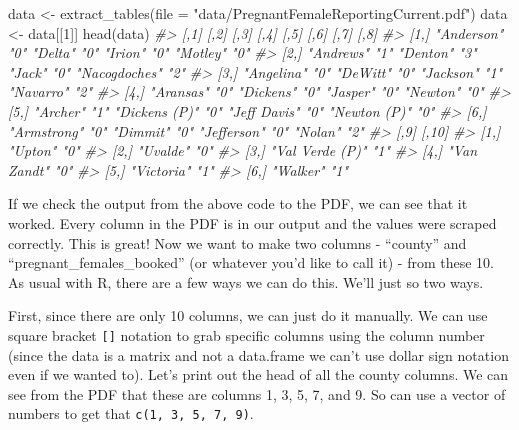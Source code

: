 \documentclass[
]{krantz}
\makeatletter
\newenvironment{Shaded}{\begin{snugshade}}{\end{snugshade}}
\newcommand{\AttributeTok}[1]{\textcolor[rgb]{0.61,0.61,0.61}{#1}}
\newcommand{\CommentTok}[1]{\textcolor[rgb]{0.37,0.37,0.37}{\textit{#1}}}
\newcommand{\DecValTok}[1]{\textcolor[rgb]{0.06,0.06,0.06}{#1}}
\newcommand{\FunctionTok}[1]{\textcolor[rgb]{0,0,0}{#1}}
\newcommand{\NormalTok}[1]{#1}
\newcommand{\OtherTok}[1]{\textcolor[rgb]{0.37,0.37,0.37}{#1}}
\newcommand{\StringTok}[1]{\textcolor[rgb]{0.5,0.5,0.5}{#1}}
\newenvironment{kframe}{%
\medskip{}
\setlength{\fboxsep}{.8em}
 \def\at@end@of@kframe{}%
 \ifinner\ifhmode%
  \def\at@end@of@kframe{\end{minipage}}%
  \begin{minipage}{\columnwidth}%
 \fi\fi%
 \def\FrameCommand##1{\hskip\@totalleftmargin \hskip-\fboxsep
 \colorbox{shadecolor}{##1}\hskip-\fboxsep
     \hskip-\linewidth \hskip-\@totalleftmargin \hskip\columnwidth}%
 \MakeFramed {\advance\hsize-\width
   \@totalleftmargin\z@ \linewidth\hsize
   \@setminipage}}%
 {\par\unskip\endMakeFramed%
 \at@end@of@kframe}
\renewenvironment{Shaded}{\begin{kframe}}{\end{kframe}}
\makeatother
\begin{document}
\begin{Shaded}
\begin{Highlighting}[]
\NormalTok{data }\OtherTok{\textless{}{-}} \FunctionTok{extract\_tables}\NormalTok{(}\AttributeTok{file =} \StringTok{"data/PregnantFemaleReportingCurrent.pdf"}\NormalTok{)}
\NormalTok{data }\OtherTok{\textless{}{-}}\NormalTok{ data[[}\DecValTok{1}\NormalTok{]]}
\FunctionTok{head}\NormalTok{(data)}
\CommentTok{\#\textgreater{}      [,1]        [,2] [,3]          [,4] [,5]         [,6] [,7]          [,8]}
\CommentTok{\#\textgreater{} [1,] "Anderson"  "0"  "Delta"       "0"  "Irion"      "0"  "Motley"      "0" }
\CommentTok{\#\textgreater{} [2,] "Andrews"   "1"  "Denton"      "3"  "Jack"       "0"  "Nacogdoches" "2" }
\CommentTok{\#\textgreater{} [3,] "Angelina"  "0"  "DeWitt"      "0"  "Jackson"    "1"  "Navarro"     "2" }
\CommentTok{\#\textgreater{} [4,] "Aransas"   "0"  "Dickens"     "0"  "Jasper"     "0"  "Newton"      "0" }
\CommentTok{\#\textgreater{} [5,] "Archer"    "1"  "Dickens (P)" "0"  "Jeff Davis" "0"  "Newton (P)"  "0" }
\CommentTok{\#\textgreater{} [6,] "Armstrong" "0"  "Dimmit"      "0"  "Jefferson"  "0"  "Nolan"       "2" }
\CommentTok{\#\textgreater{}      [,9]            [,10]}
\CommentTok{\#\textgreater{} [1,] "Upton"         "0"  }
\CommentTok{\#\textgreater{} [2,] "Uvalde"        "0"  }
\CommentTok{\#\textgreater{} [3,] "Val Verde (P)" "1"  }
\CommentTok{\#\textgreater{} [4,] "Van Zandt"     "0"  }
\CommentTok{\#\textgreater{} [5,] "Victoria"      "1"  }
\CommentTok{\#\textgreater{} [6,] "Walker"        "1"}
\end{Highlighting}
\end{Shaded}

If we check the output from the above code to the PDF, we can see that it worked. Every column in the PDF is in our output and the values were scraped correctly. This is great! Now we want to make two columns - ``county'' and ``pregnant\_females\_booked'' (or whatever you'd like to call it) - from these 10. As usual with R, there are a few ways we can do this. We'll just so two ways.

First, since there are only 10 columns, we can just do it manually. We can use square bracket \texttt{{[}{]}} notation to grab specific columns using the column number (since the data is a matrix and not a data.frame we can't use dollar sign notation even if we wanted to). Let's print out the head of all the county columns. We can see from the PDF that these are columns 1, 3, 5, 7, and 9. So can use a vector of numbers to get that \texttt{c(1,\ 3,\ 5,\ 7,\ 9)}.
\end{document}
